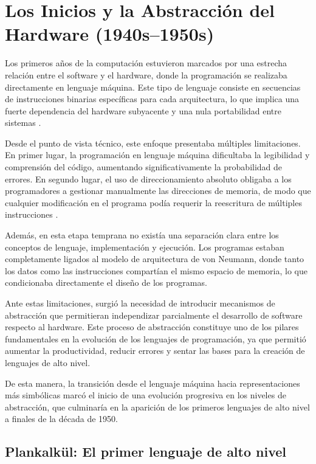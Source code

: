 \documentclass[12pt]{article}
\begin{document}
\vspace{0.8cm}

\section{Los Inicios y la Abstracción del Hardware (1940s–1950s)}

Los primeros años de la computación estuvieron marcados por una estrecha relación entre el software y el hardware, donde la programación se realizaba directamente en lenguaje máquina. Este tipo de lenguaje consiste en secuencias de instrucciones binarias específicas para cada arquitectura, lo que implica una fuerte dependencia del hardware subyacente y una nula portabilidad entre sistemas \cite{sebesta}.

Desde el punto de vista técnico, este enfoque presentaba múltiples limitaciones. En primer lugar, la programación en lenguaje máquina dificultaba la legibilidad y comprensión del código, aumentando significativamente la probabilidad de errores. En segundo lugar, el uso de direccionamiento absoluto obligaba a los programadores a gestionar manualmente las direcciones de memoria, de modo que cualquier modificación en el programa podía requerir la reescritura de múltiples instrucciones \cite{sebesta}.

Además, en esta etapa temprana no existía una separación clara entre los conceptos de lenguaje, implementación y ejecución. Los programas estaban completamente ligados al modelo de arquitectura de von Neumann, donde tanto los datos como las instrucciones compartían el mismo espacio de memoria, lo que condicionaba directamente el diseño de los programas.

Ante estas limitaciones, surgió la necesidad de introducir mecanismos de abstracción que permitieran independizar parcialmente el desarrollo de software respecto al hardware. Este proceso de abstracción constituye uno de los pilares fundamentales en la evolución de los lenguajes de programación, ya que permitió aumentar la productividad, reducir errores y sentar las bases para la creación de lenguajes de alto nivel.

De esta manera, la transición desde el lenguaje máquina hacia representaciones más simbólicas marcó el inicio de una evolución progresiva en los niveles de abstracción, que culminaría en la aparición de los primeros lenguajes de alto nivel a finales de la década de 1950.


\subsection{Plankalkül: El primer lenguaje de alto nivel}
\end{document}
